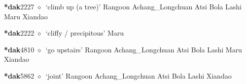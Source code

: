   \begin{list}{}{\leftmargin=1.5em \itemindent=-1.5em}
  \item {\footnotesize \textbf{*dak}}{\tiny 2227}
         $\diamond$~`climb up (a tree)'
         Rangoon 
\hspace{1ex}
         Achang\_Longchuan 
\hspace{1ex}
         Atsi 
\hspace{1ex}
         Bola 
\hspace{1ex}
         Lashi 
\hspace{1ex}
         Maru 
\hspace{1ex}
         Xiandao 
  \item {\footnotesize \textbf{*dak}}{\tiny 2222}
\hspace{1ex}
         $\diamond$~`cliffy / precipitous'
         Maru 
  \item {\footnotesize \textbf{*dak}}{\tiny 4810}
\hspace{1ex}
         $\diamond$~`go upstairs'
         Rangoon 
\hspace{1ex}
         Achang\_Longchuan 
\hspace{1ex}
         Atsi 
\hspace{1ex}
         Bola 
\hspace{1ex}
         Lashi 
\hspace{1ex}
         Maru 
\hspace{1ex}
         Xiandao 
  \item {\footnotesize \textbf{*dak}}{\tiny 5862}
\hspace{1ex}
         $\diamond$~`joint'
         Rangoon 
\hspace{1ex}
         Achang\_Longchuan 
\hspace{1ex}
         Atsi 
\hspace{1ex}
         Bola 
\hspace{1ex}
         Lashi 
\hspace{1ex}
         Xiandao 
  \end{list}

